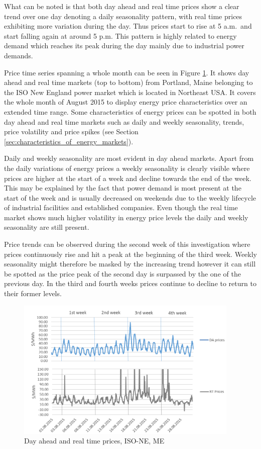 What can be noted is that both day ahead and real time prices show a clear trend over one day denoting a daily seasonality pattern, with real time prices exhibiting more variation during the day. Thus prices start to rise at 5 a.m.~and start falling again at around 5 p.m. This pattern is highly related to energy demand which reaches its peak during the day mainly due to industrial power demands. 

Price time series spanning a whole month can be seen in Figure \ref{fig:da_rt_prices_aug_2015}. It shows day ahead and real time markets (top to bottom) from Portland, Maine belonging to the ISO New England power market which is located in Northeast USA. It covers the whole month of August 2015 to display energy price characteristics over an extended time range. 
Some characteristics of energy prices can be spotted in both day ahead and real time markets such as daily and weekly seasonality, trends, price volatility and price spikes (see Section \ref{sec:characteristics_of_energy_markets}). 

Daily and weekly seasonality are most evident in day ahead markets. Apart from the daily variations of energy prices a weekly seasonality is clearly visible where prices are higher at the start of a week and decline towards the end of the week. This may be explained by the fact that power demand is most present at the start of the week and is usually decreased on weekends due to the weekly lifecycle of industrial facilities and established companies. Even though the real time market shows much higher volatility in energy price levels the daily and weekly seasonality are still present. 

Price trends can be observed during the second week of this investigation where prices continuously rise and hit a peak at the beginning of the third week. Weekly seasonality might therefore be masked by the increasing trend however it can still be spotted as the price peak of the second day is surpassed by the one of the previous day. In the third and fourth weeks prices continue to decline to return to their former levels. 

\begin{figure}[htbp]
	\centering
		\includegraphics[width=0.95\textwidth]{figures/data_analysis/da_rt_prices_aug_2015.png}
	\caption{Day ahead and real time prices, ISO-NE, ME}
	\label{fig:da_rt_prices_aug_2015}
\end{figure}

